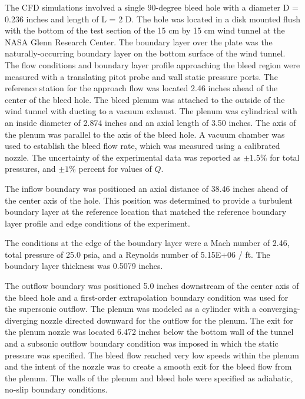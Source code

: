The CFD simulations involved a single 90-degree bleed hole with a diameter D = 0.236 inches and length of L = 2 D. The hole was located in a disk mounted flush with the bottom of the test section of the 15 cm by 15 cm wind tunnel at the NASA Glenn Research Center. The boundary layer over the plate was the naturally-occurring boundary layer on the bottom surface of the wind tunnel. The flow conditions and boundary layer profile approaching the bleed region were measured with a translating pitot probe and wall static pressure ports. The reference station for the approach flow was located 2.46 inches ahead of the center of the bleed hole. The bleed plenum was attached to the outside of the wind tunnel with ducting to a vacuum exhaust. The plenum was cylindrical with an inside diameter of 2.874 inches and an axial length of 3.50 inches. The axis of the plenum was parallel to the axis of the bleed hole. A vacuum chamber was used to establish the bleed flow rate, which was measured using a calibrated nozzle. The uncertainty of the experimental data was reported as $\pm1.5 \%$ for total pressures, and $\pm 1 \%$ percent for values of $Q$. 


The inflow boundary was positioned an axial distance of 38.46 inches ahead of the center axis of the hole. This position was determined to provide a turbulent boundary layer at the reference location that matched the reference boundary layer profile and edge conditions of the experiment. 

The  conditions at the edge of the boundary layer were a Mach number of 2.46, total pressure of 25.0 psia, and a Reynolds number of 5.15E+06 / ft. The boundary layer thickness was 0.5079 inches. 

The outflow boundary was positioned 5.0 inches downstream of the center axis of the bleed hole and a first-order extrapolation boundary condition was used for the supersonic outflow. The plenum was modeled as a cylinder with a converging-diverging nozzle directed downward for the outflow for the plenum. The exit for the plenum nozzle was located 6.472 inches below the bottom wall of the tunnel and a subsonic outflow boundary condition was imposed in which the static pressure was specified. The bleed flow reached very low speeds within the plenum and the intent of the nozzle was to create a smooth exit for the bleed flow from the plenum. The walls of the plenum and bleed hole were specified as adiabatic, no-slip boundary conditions.

